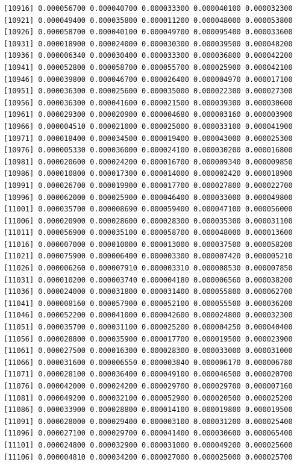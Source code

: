 \documentclass[]{article}
\begin{document}
\begin{verbatim}
[10916] 0.000056700 0.000040700 0.000033300 0.000040100 0.000032300
[10921] 0.000049400 0.000035800 0.000011200 0.000048000 0.000053800
[10926] 0.000058700 0.000040100 0.000049700 0.000095400 0.000033600
[10931] 0.000018900 0.000024000 0.000030300 0.000039500 0.000048200
[10936] 0.000006340 0.000030400 0.000033300 0.000036800 0.000042200
[10941] 0.000052800 0.000058700 0.000055700 0.000025900 0.000042100
[10946] 0.000039800 0.000046700 0.000026400 0.000004970 0.000017100
[10951] 0.000036300 0.000025600 0.000035000 0.000022300 0.000027300
[10956] 0.000036300 0.000041600 0.000021500 0.000039300 0.000030600
[10961] 0.000029300 0.000020900 0.000004680 0.000003160 0.000003900
[10966] 0.000004510 0.000021000 0.000025000 0.000033100 0.000041900
[10971] 0.000018400 0.000034500 0.000019400 0.000043000 0.000025300
[10976] 0.000005330 0.000036000 0.000024100 0.000030200 0.000016800
[10981] 0.000020600 0.000024200 0.000016700 0.000009340 0.000009850
[10986] 0.000010800 0.000017300 0.000014000 0.000002420 0.000018900
[10991] 0.000026700 0.000019900 0.000017700 0.000027800 0.000022700
[10996] 0.000062000 0.000025900 0.000046400 0.000033000 0.000049800
[11001] 0.000035700 0.000008690 0.000059400 0.000047100 0.000056000
[11006] 0.000020900 0.000028600 0.000028300 0.000035300 0.000031100
[11011] 0.000056900 0.000035100 0.000058700 0.000048000 0.000013600
[11016] 0.000007000 0.000010000 0.000013000 0.000037500 0.000058200
[11021] 0.000075900 0.000006400 0.000003300 0.000007420 0.000005210
[11026] 0.000006260 0.000007910 0.000003310 0.000008530 0.000007850
[11031] 0.000010200 0.000003740 0.000004180 0.000006560 0.000038200
[11036] 0.000024000 0.000031800 0.000031400 0.000055800 0.000062700
[11041] 0.000008160 0.000057900 0.000052100 0.000055500 0.000036200
[11046] 0.000052200 0.000041000 0.000042600 0.000024800 0.000032300
[11051] 0.000035700 0.000031100 0.000025200 0.000004250 0.000040400
[11056] 0.000028800 0.000035900 0.000017700 0.000019500 0.000023900
[11061] 0.000027500 0.000016300 0.000028300 0.000033000 0.000031000
[11066] 0.000031600 0.000006550 0.000003840 0.000006170 0.000006780
[11071] 0.000028100 0.000036400 0.000049100 0.000046500 0.000020700
[11076] 0.000042000 0.000024200 0.000029700 0.000029700 0.000007160
[11081] 0.000049200 0.000032100 0.000052900 0.000020500 0.000025200
[11086] 0.000033900 0.000028800 0.000014100 0.000019800 0.000019500
[11091] 0.000028000 0.000029400 0.000003100 0.000031200 0.000025400
[11096] 0.000027100 0.000029700 0.000041400 0.000030600 0.000065400
[11101] 0.000024800 0.000032900 0.000031000 0.000049200 0.000025600
[11106] 0.000004810 0.000034200 0.000027000 0.000025000 0.000025700

\end{verbatim}
\end{document}
